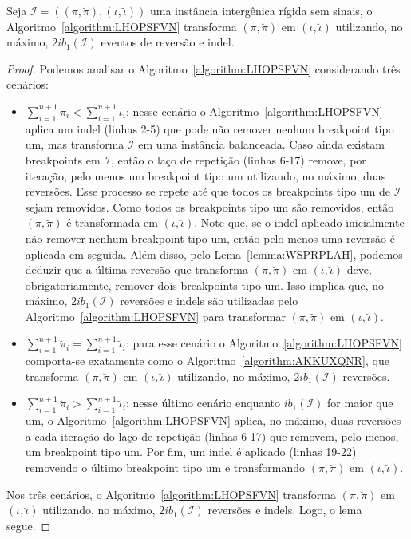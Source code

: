 \begin{lemma}\label{lemma:XUDIVWPC}
Seja $\mathcal{I}=((\pi,\breve\pi),(\iota,\breve\iota))$ uma instância intergênica rígida sem sinais, o Algoritmo~\ref{algorithm:LHOPSFVN} transforma $(\pi,\breve\pi)$ em $(\iota,\breve\iota)$ utilizando, no máximo, $2ib_1(\mathcal{I})$ eventos de reversão e indel.
\end{lemma}
\begin{proof}
  Podemos analisar o Algoritmo~\ref{algorithm:LHOPSFVN} considerando três cenários:
  \begin{itemize}
    \item $\sum_{i=1}^{n+1}\breve\pi_i < \sum_{i=1}^{n+1}\breve\iota_i$: nesse cenário o Algoritmo~\ref{algorithm:LHOPSFVN} aplica um indel (linhas 2-5) que pode não remover nenhum breakpoint tipo um, mas transforma $\mathcal{I}$ em uma instância balanceada. Caso ainda existam breakpoints em $\mathcal{I}$, então o laço de repetição (linhas 6-17) remove, por iteração, pelo menos um breakpoint tipo um utilizando, no máximo, duas reversões. Esse processo se repete até que todos os breakpoints tipo um de $\mathcal{I}$ sejam removidos. Como todos os breakpoints tipo um são removidos, então $(\pi,\breve\pi)$ é transformada em $(\iota,\breve\iota)$. Note que, se o indel aplicado inicialmente não remover nenhum breakpoint tipo um, então pelo menos uma reversão é aplicada em seguida. Além disso, pelo Lema~\ref{lemma:WSPRPLAH}, podemos deduzir que a última reversão que transforma $(\pi,\breve\pi)$ em $(\iota,\breve\iota)$ deve, obrigatoriamente, remover dois breakpoints tipo um. Isso implica que, no máximo, $2ib_1(\mathcal{I})$ reversões e indels são utilizadas pelo Algoritmo~\ref{algorithm:LHOPSFVN} para transformar $(\pi,\breve\pi)$ em $(\iota,\breve\iota)$.
    \item $\sum_{i=1}^{n+1}\breve\pi_i = \sum_{i=1}^{n+1}\breve\iota_i$: para esse cenário o Algoritmo~\ref{algorithm:LHOPSFVN} comporta-se exatamente como o Algoritmo~\ref{algorithm:AKKUXQNR}, que transforma $(\pi,\breve\pi)$ em $(\iota,\breve\iota)$ utilizando, no máximo, $2ib_1(\mathcal{I})$ reversões.
    \item $\sum_{i=1}^{n+1}\breve\pi_i > \sum_{i=1}^{n+1}\breve\iota_i$: nesse último cenário enquanto $ib_1(\mathcal{I})$ for maior que um, o Algoritmo~\ref{algorithm:LHOPSFVN} aplica, no máximo, duas reversões a cada iteração do laço de repetição (linhas 6-17) que removem, pelo menos, um breakpoint tipo um. Por fim, um indel é aplicado (linhas 19-22) removendo o último breakpoint tipo um e transformando $(\pi,\breve\pi)$ em $(\iota,\breve\iota)$.
  \end{itemize}
  Nos três cenários, o Algoritmo~\ref{algorithm:LHOPSFVN} transforma $(\pi,\breve\pi)$ em $(\iota,\breve\iota)$ utilizando, no máximo, $2ib_1(\mathcal{I})$ reversões e indels. Logo, o lema segue.
\end{proof}

